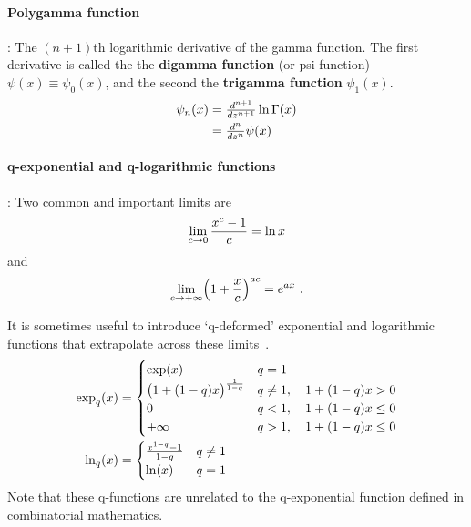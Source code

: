 \paragraph*{Polygamma function}\hspace{-0.8em}\cite{Abramowitz1965}:
The $(n+1)$th logarithmic derivative of the gam\-ma function. The first derivative is called the 
the {\bf digamma function} (or psi function) $\psi(x)\equiv\psi_0(x)$, and the second the {\bf trigamma function} $\psi_1(x)$.
\begin{align*}
	\psi_n(x)&= \tfrac{d^{n+1}}{dz^{n+1}} \ln \Gamma(x) 	
	\\ &=  \tfrac{d^{n}}{dz^{n}} \psi(x) 					
\end{align*}



\paragraph*{q-exponential and q-logarithmic functions}\hspace{-0.8em}\cite{Tsallis1994,Yamano2002}:
Two common and important limits are
\[
\lim_{c\rightarrow0} \frac{x^c -1}{c} = \ln x
\notag 
\]
and
\[
\lim_{c\rightarrow+\infty} \Left(1 + \frac{x}{c} \Right)^{a c} = e^{a x} \ . \checked
\notag
\]



It is sometimes useful to introduce `q-deformed' exponential and logarithmic functions that extrapolate across these limits~\cite{Tsallis1994,Yamano2002}.
\begin{align*}
\checked
\exp_q(x) &=  
\begin{cases}
\exp(x) & q= 1 \\
\bigl(1+ (1-q) x \bigr)^{\frac{1}{1-q} }& q\neq 1, \quad 1+(1-q)x>0 \\
0 & q< 1, \quad 1+(1-q)x\leq0 \\
+\infty & q> 1, \quad 1+(1-q)x\leq0 
\end{cases}
\\
\checked 
\ln_q(x) &=  
\begin{cases}
\frac{x^{1-q} -1}{1-q}& q\neq 1\\
\ln(x) & q= 1 \\
\end{cases}
\end{align*}
Note that these q-functions  are unrelated to the q-exponential function defined in combinatorial mathematics.


